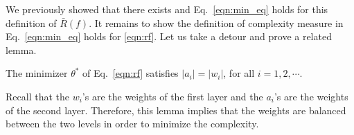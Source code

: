  We previously showed that there exists
and Eq.~\eqref{eqn:min_eq} holds for this definition of $\bar{R}(f)$. It remains to show the definition of complexity measure in Eq.~\eqref{eqn:min_eq} holds for \eqref{eqn:rf}. Let us take a detour and prove a related lemma.


\begin{lemma}\label{lemma:a=w}
The minimizer $\theta^*$ of Eq.~\eqref{eqn:rf} satisfies $|a_i| = |w_i|$, for all $i = 1, 2, \cdots$. 
\end{lemma}

Recall that the $w_i$'s are the weights of the first layer and the $a_i$'s are the weights of the second layer. Therefore, this lemma implies that the weights are balanced between the two levels in order to minimize the complexity.

